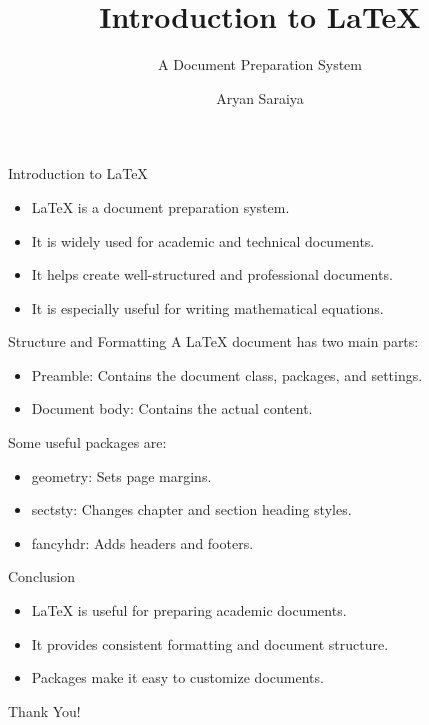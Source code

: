 \documentclass{beamer}
\title[Introduction to LaTeX]{Introduction to LaTeX}
\subtitle{A Document Preparation System}
\author[Aryan Saraiya]{Aryan Saraiya}
\institute[Technical Writing]{Technical Writing}
\date{}
\begin{document}
\begin{frame}
    \titlepage
\end{frame}

\begin{frame}{Introduction to LaTeX}
    \begin{itemize}
        \item LaTeX is a document preparation system.
        \item It is widely used for academic and technical documents.
        \item It helps create well-structured and professional documents.
        \item It is especially useful for writing mathematical equations.
    \end{itemize}
\end{frame}

\begin{frame}{Structure and Formatting}
    A LaTeX document has two main parts:

    \begin{itemize}
        \item Preamble: Contains the document class, packages, and settings.
        \item Document body: Contains the actual content.
    \end{itemize}

    Some useful packages are:

    \begin{itemize}
        \item geometry: Sets page margins.
        \item sectsty: Changes chapter and section heading styles.
        \item fancyhdr: Adds headers and footers.
    \end{itemize}
\end{frame}

\begin{frame}{Conclusion}
    \begin{itemize}
        \item LaTeX is useful for preparing academic documents.
        \item It provides consistent formatting and document structure.
        \item Packages make it easy to customize documents.
    \end{itemize}

    \vspace{0.5cm}
    \centering
    Thank You!
\end{frame}
\end{document}

